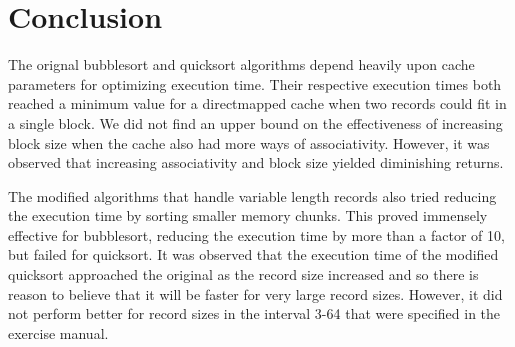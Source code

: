 \section{Conclusion}
The orignal bubblesort and quicksort algorithms depend heavily upon cache parameters for optimizing execution time. 
Their respective execution times both reached a minimum value for a directmapped cache when two records could fit in a single block.
We did not find an upper bound on the effectiveness of increasing block size when the cache also had more ways of associativity. However,
it was observed that increasing associativity and block size yielded diminishing returns.

The modified algorithms that handle variable length records also tried reducing the execution time by sorting smaller memory chunks.
This proved immensely effective for bubblesort, reducing the execution time by more than a factor of 10, but failed for quicksort. It 
was observed that the execution time of the modified quicksort approached the original as the record size increased and so there is 
reason to believe that it will be faster for very large record sizes. However, it did not
perform better for record sizes in the interval 3-64 that were specified in the exercise manual.
